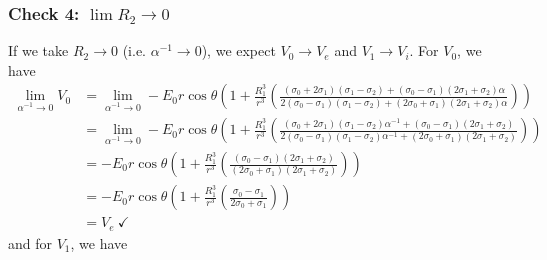 \subsubsection{Check 4: $\lim R_2 \to 0$}
If we take $R_2 \to 0$ (i.e. $\alpha^{-1} \to 0$), we expect $V_0 \to V_e$ and $V_1 \to V_i$. For $V_0$, we have
\begin{displaymath}
    \begin{split}
        \lim_{\alpha^{-1} \to 0} V_0
       &=  \lim_{\alpha^{-1} \to 0}
         -E_0 r \cos\theta
        \left(1+
        \frac{R_1^{3}}{r^3}
        \left(
        \frac{
        (\sigma_0 + 2\sigma_1)(\sigma_1 - \sigma_2) + (\sigma_0 - \sigma_1)(2\sigma_1 + \sigma_2)\alpha
        }
        {
        2 (\sigma_0-\sigma_1)(\sigma_1 - \sigma_2) + (2\sigma_0 + \sigma_1)(2\sigma_1 + \sigma_2)\alpha
        }
        \right)\right)
        \\
        &=  \lim_{\alpha^{-1} \to 0}
         -E_0 r \cos\theta
        \left(1+
        \frac{R_1^{3}}{r^3}
        \left(
        \frac{
        (\sigma_0 + 2\sigma_1)(\sigma_1 - \sigma_2)\alpha^{-1} + (\sigma_0 - \sigma_1)(2\sigma_1 + \sigma_2)
        }
        {
        2 (\sigma_0-\sigma_1)(\sigma_1 - \sigma_2)\alpha^{-1} + (2\sigma_0 + \sigma_1)(2\sigma_1 + \sigma_2)
        }
        \right)\right)
        \\
        &=
         -E_0 r \cos\theta
        \left(1+
        \frac{R_1^{3}}{r^3}
        \left(
        \frac{
        (\sigma_0 - \sigma_1)(2\sigma_1 + \sigma_2)
        }
        {
        (2\sigma_0 + \sigma_1)(2\sigma_1 + \sigma_2)
        }
        \right)\right)
        \\
        &=
         -E_0 r \cos\theta
        \left(1+
        \frac{R_1^{3}}{r^3}
        \left(
        \frac{
        \sigma_0 - \sigma_1
        }
        {
        2\sigma_0 + \sigma_1
        }
        \right)\right)
        \\
        & = V_e ~\checkmark
    \end{split}
\end{displaymath}
and for $V_1$, we have
